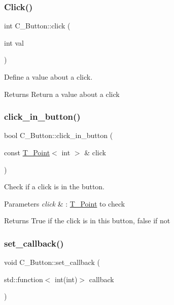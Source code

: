 \subsubsection{\texorpdfstring{Click()}{click()}}
{\footnotesize\ttfamily int C_Button\+::click (\begin{DoxyParamCaption}\item[{int}]{val }\end{DoxyParamCaption})}



Define a value about a click. 

\begin{DoxyReturn}{Returns}
Return a value about a click 
\end{DoxyReturn}
\mbox{\label{classButton_acf7ec691fccf7fc66863a6bb24d31ce5}} 
\subsubsection{\texorpdfstring{click\+\_\+in\+\_\+button()}{click\_in\_button()}}
{\footnotesize\ttfamily bool C_Button\+::click\+\_\+in\+\_\+button (\begin{DoxyParamCaption}\item[{const \hyperlink{classPoint}{T_Point}$<$ int $>$ \&}]{click }\end{DoxyParamCaption})}



Check if a click is in the button. 


\begin{DoxyParams}{Parameters}
{\em click} & \+: \hyperlink{classPoint}{T_Point} to check \\
\hline
\end{DoxyParams}
\begin{DoxyReturn}{Returns}
True if the click is in this button, false if not 
\end{DoxyReturn}
\mbox{\label{classButton_aff79964a98ce6c76d0ece8502a830985}} 
\subsubsection{\texorpdfstring{set\+\_\+callback()}{set\_callback()}}
{\footnotesize\ttfamily void C_Button\+::set\+\_\+callback (\begin{DoxyParamCaption}\item[{std\+::function$<$ int(int)$>$}]{callback }\end{DoxyParamCaption})}



